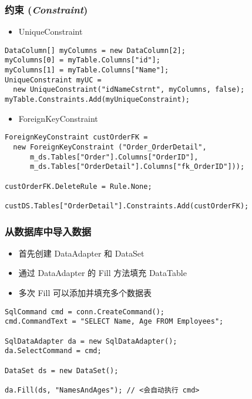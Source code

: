 \begin{frame}[fragile]
\frametitle{约束 (\textit{Constraint})}
\begin{itemize}
\item UniqueConstraint
\end{itemize}
\begin{lstlisting}
DataColumn[] myColumns = new DataColumn[2];
myColumns[0] = myTable.Columns["id"];
myColumns[1] = myTable.Columns["Name"];
UniqueConstraint myUC = 
  new UniqueConstraint("idNameCstrnt", myColumns, false);
myTable.Constraints.Add(myUniqueConstraint);
\end{lstlisting}
\begin{itemize}
\item ForeignKeyConstraint
\end{itemize}
\begin{lstlisting}
ForeignKeyConstraint custOrderFK = 
  new ForeignKeyConstraint ("Order_OrderDetail", 
      m_ds.Tables["Order"].Columns["OrderID"],       
      m_ds.Tables["OrderDetail"].Columns["fk_OrderID"]));

custOrderFK.DeleteRule = Rule.None;

custDS.Tables["OrderDetail"].Constraints.Add(custOrderFK); 
\end{lstlisting}
\end{frame}

\begin{frame}[fragile]
\frametitle{从数据库中导入数据}
\begin{itemize}
\item 首先创建 DataAdapter 和 DataSet
\item 通过 DataAdapter 的 Fill 方法填充 DataTable
\item 多次 Fill 可以添加并填充多个数据表
\end{itemize}
\begin{lstlisting}[escapeinside=<>]
SqlCommand cmd = conn.CreateCommand();
cmd.CommandText = "SELECT Name, Age FROM Employees";

SqlDataAdapter da = new SqlDataAdapter();
da.SelectCommand = cmd;

DataSet ds = new DataSet();

da.Fill(ds, "NamesAndAges"); // <会自动执行 cmd>
\end{lstlisting}
\end{frame}

